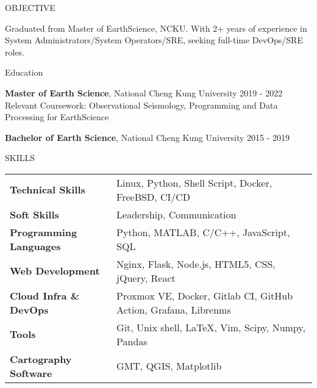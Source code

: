 \documentclass{resume} %
\begin{document}

\begin{rSection}{OBJECTIVE}

	{Graduated from Master of EarthScience, NCKU\@.  With 2+ years of experience in System Administrators/System Operators/SRE, seeking full-time DevOps/SRE roles.}


\end{rSection}

\begin{rSection}{Education}

{\bf Master of Earth Science}, National Cheng Kung University \hfill {2019 - 2022}\\
Relevant Coursework: Observational Seismology, Programming and Data Processing for EarthScience

{\bf Bachelor of Earth Science}, National Cheng Kung University \hfill {2015 - 2019}


\end{rSection}

\begin{rSection}{SKILLS}

\begin{tabular}{ @{} >{\bfseries}l @{\hspace{6ex}} l }
Technical Skills & Linux, Python, Shell Script, Docker, FreeBSD, CI/CD
\\
Soft Skills & Leadership, Communication\\
Programming Languages & Python, MATLAB, C/C++, JavaScript, SQL \\
Web Development & Nginx, Flask, Node.js, HTML5, CSS, jQuery, React\\
Cloud Infra \& DevOps & Proxmox VE, Docker, Gitlab CI, GitHub Action, Grafana, Librenms \\
Tools & Git, Unix shell, LaTeX, Vim, Scipy, Numpy, Pandas \\
Cartography Software & GMT, QGIS, Matplotlib \\
\end{tabular}\\
\end{rSection}
\end{document}
